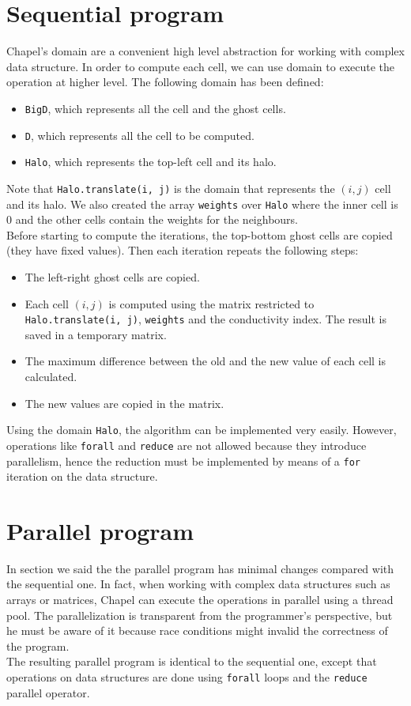 \documentclass{article}
\begin{document}
\section{Sequential program}
Chapel's domain are a convenient high level abstraction for working with complex data structure. In order to compute each cell, we can use domain to execute the operation at higher level. The following domain has been defined:
\begin{itemize}
    \item \texttt{BigD}, which represents all the cell and the ghost cells.
    \item \texttt{D}, which represents all the cell to be computed.
    \item \texttt{Halo}, which represents the top-left cell and its halo.
\end{itemize}
Note that \texttt{Halo.translate(i, j)} is the domain that represents the $(i,j)$ cell and its halo. We also created the array \texttt{weights} over \texttt{Halo} where the inner cell is 0 and the other cells contain the weights for the neighbours. \\
Before starting to compute the iterations, the top-bottom ghost cells are copied (they have fixed values). Then each iteration repeats the following steps:
\begin{itemize}
    \item The left-right ghost cells are copied.
    \item Each cell $(i,j)$ is computed using the matrix restricted to \texttt{Halo.translate(i, j)}, \texttt{weights} and the conductivity index. The result is saved in a temporary matrix.
    \item The maximum difference between the old and the new value of each cell is calculated.
    \item The new values are copied in the matrix.
\end{itemize}
Using the domain \texttt{Halo}, the algorithm can be implemented very easily. However, operations like \texttt{forall} and \texttt{reduce} are not allowed because they introduce parallelism, hence the reduction must be implemented by means of a \texttt{for} iteration on the data structure.

\section{Parallel program}
In section  we said the the parallel program has minimal changes compared with the sequential one. In fact, when working with complex data structures such as arrays or matrices, Chapel can execute the operations in parallel using a thread pool. The parallelization is transparent from the programmer's perspective, but he must be aware of it because race conditions might invalid the correctness of the program. \\
The resulting parallel program is identical to the sequential one, except that operations on data structures are done using \texttt{forall} loops and the \texttt{reduce} parallel operator.
\end{document}
